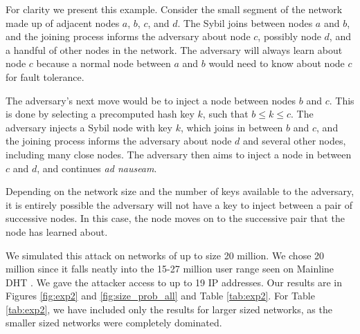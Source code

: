 \documentclass[11pt,conference]{IEEEtran}
\begin{document}
For clarity we present this example. 
Consider the small segment of the network made up of adjacent nodes $a$, $b$, $c$, and $d$.
The Sybil joins between nodes $a$ and $b$, and the joining process informs the adversary about node $c$, possibly node $d$, and a handful of other nodes in the network.
The adversary will always learn about node $c$ because a normal node between $a$ and $b$ would need to know about node $c$ for fault tolerance.

The adversary's next move would be to inject a node between nodes $b$ and $c$.
This is done by selecting a precomputed hash key $k$, such that $b \leq k \leq c$.
The adversary injects a Sybil node with key $k$, which joins in between $b$ and $c$, and the joining process informs the adversary about node $d$ and several other nodes, including many close nodes.
The adversary then aims to inject a node in between $c$ and $d$, and continues \textit{ad nauseam}.

Depending on the network size and the number of keys available to the adversary, it is entirely possible the adversary will not have a key to inject between a pair of successive nodes.
In this case, the node moves on to the successive pair that the node has learned about.


We simulated this attack on networks of up to size 20 million.
We chose 20 million since it falls neatly into the 15-27 million user range seen on Mainline DHT \cite{mainlineMeasure}.
We gave the attacker access to up to 19 IP addresses.
Our results are in Figures \ref{fig:exp2} and \ref{fig:size_prob_all} and Table \ref{tab:exp2}.
For Table \ref{tab:exp2}, we have included only the results for larger sized networks, as the smaller sized networks were completely dominated.
\end{document}
